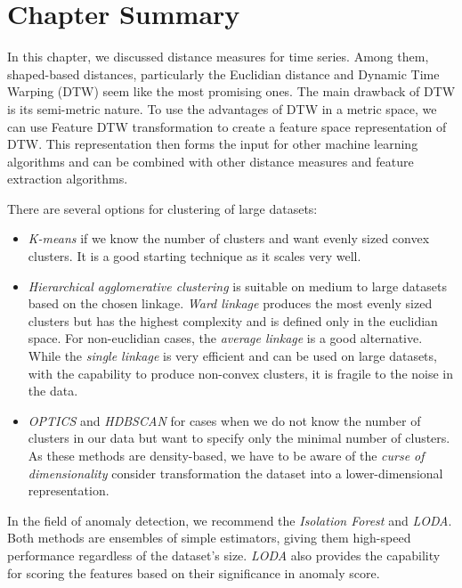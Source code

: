 \section{Chapter Summary}
In this chapter, we discussed distance measures for time series. Among them, shaped-based distances, particularly the Euclidian distance and Dynamic Time Warping (DTW) seem like the most promising ones. The main drawback of DTW is its semi-metric nature. To use the advantages of DTW in a metric space, we can use Feature DTW transformation to create a feature space representation of DTW. This representation then forms the input for other machine learning algorithms and can be combined with other distance measures and feature extraction algorithms.

There are several options for clustering of large datasets:
\begin{itemize}
    \item \textit{K-means} if we know the number of clusters and want evenly sized convex clusters. It is a good starting technique as it scales very well.
    \item \textit{Hierarchical agglomerative clustering} is suitable on medium to large datasets based on the chosen linkage. \textit{Ward linkage} produces the most evenly sized clusters but has the highest complexity and is defined only in the euclidian space. For non-euclidian cases, the \textit{average linkage} is a good alternative. While the \textit{single linkage} is very efficient and can be used on large datasets, with the capability to produce non-convex clusters, it is fragile to the noise in the data.
    \item \textit{OPTICS} and \textit{HDBSCAN} for cases when we do not know the number of clusters in our data but want to specify only the minimal number of clusters. As these methods are density-based, we have to be aware of the \textit{curse of dimensionality} consider transformation the dataset into a lower-dimensional representation.
\end{itemize}

In the field of anomaly detection, we recommend the \textit{Isolation Forest} and \textit{LODA}. Both methods are ensembles of simple estimators, giving them high-speed performance regardless of the dataset's size. \textit{LODA} also provides the capability for scoring the features based on their significance in anomaly score.
